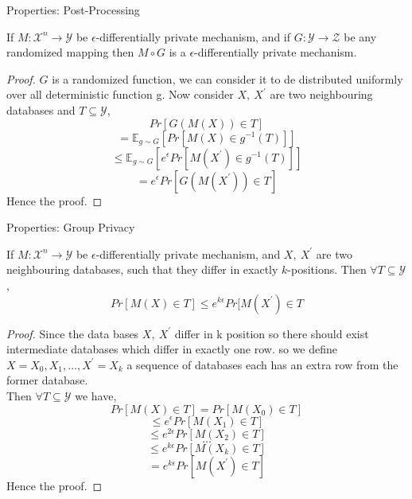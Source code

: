 \documentclass[aspectratio=169]{beamer}
\begin{document}
\begin{frame}{Properties: Post-Processing}
\begin{theorem}
If $M:\mathscr{X}^n \rightarrow \mathscr{Y}$ be $\epsilon$-differentially private mechanism, and if $G:\mathscr{Y} \rightarrow \mathscr{Z}$ be any randomized mapping then $M \circ G$ is a $\epsilon$-differentially private mechanism.
\end{theorem}
\pause
\begin{proof}
$G$ is a randomized function, we can consider it to de distributed uniformly over all deterministic function g. Now consider $X, \: X^\prime$ are two neighbouring databases and $T \subseteq \mathscr{Y}$,
$$Pr[G(M(X)) \in T]$$
$$=\mathbb{E}_{g \sim G}[Pr[M(X) \in g^{-1}(T)]]$$ 
$$\leq \mathbb{E}_{g \sim G}[e^\epsilon Pr[M(X^\prime) \in g^{-1}(T)]]$$
$$=e^\epsilon Pr[G(M(X^\prime)) \in T]$$
Hence the proof.
\end{proof}
\end{frame}


\begin{frame}[allowframebreaks]{Properties: Group Privacy}
\begin{theorem}
If $M:\mathscr{X}^n \rightarrow \mathscr{Y}$ be $\epsilon$-differentially private mechanism, and $X, \: X^\prime$ are two neighbouring databases, such that they differ in exactly $k$-positions. Then $\forall T \subseteq \mathscr{Y}$,
$$Pr[M(X) \in T] \leq e^{k\epsilon} Pr[M(X^\prime) \in T$$
\end{theorem}

\begin{small}
\begin{proof}
Since the data bases $X, \: X^\prime$ differ in k position so there should exist intermediate databases which differ in exactly one row. so we define $X=X_0, X_1, \dots ,X^\prime=X_k$ a sequence of databases each has an extra row from the former database.\\
Then $\forall T \subseteq \mathscr{Y}$ we have,
$$Pr[M(X) \in T]=Pr[M(X_0) \in T]$$
$$\leq e^\epsilon Pr[M(X_1) \in T]$$
$$\leq e^{2\epsilon} Pr[M(X_2) \in T]$$
$$\dots$$
$$\leq e^{k\epsilon} Pr[M(X_k) \in T]$$
$$= e^{k\epsilon} Pr[M(X^\prime) \in T]$$
Hence the proof.
\end{proof}
\end{small}
\end{frame}
\end{document}
